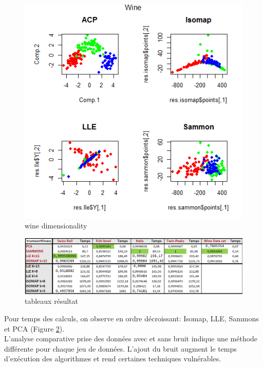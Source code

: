 \documentclass[twoside,twocolumn]{article}
\begin{document}
\begin{figure}[ht!]
  \centering
  \includegraphics[width=\linewidth]{wine.png} 
  \vspace{-10pt}
  \caption{wine dimensionality}
  \label{wine}
\end{figure}

\begin{figure}[!htbp]
  \centering
  \includegraphics[width= \linewidth]{resul.png} 
  \vspace{-10pt}
  \caption{tableaux résultat}
  \label{res}
\end{figure}

Pour temps des calculs, on observe en ordre décroissant: Isomap, LLE, Sammons et PCA (Figure \ref{res}).\\
L'analyse comparative prise des données avec et sans bruit indique une méthode différente pour chaque jeu de données. L’ajout du bruit augment le temps d’exécution des algorithmes et rend certaines techniques vulnérables.
\end{document}
